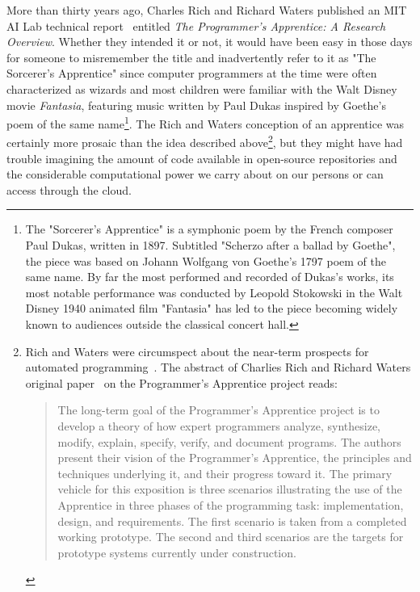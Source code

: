 More than thirty years ago, Charles Rich and Richard Waters published an MIT AI Lab technical report~\cite{RichandWatersAIM-87} entitled {\it{The Programmer's Apprentice: A Research Overview}}. Whether they intended it or not, it would have been easy in those days for someone to misremember the title and inadvertently refer to it as "The Sorcerer's Apprentice" since computer programmers at the time were often characterized as wizards and most children were familiar with the Walt Disney movie {\it{Fantasia}}, featuring music written by Paul Dukas inspired by Goethe's poem of the same name\footnote{%
%
  The "Sorcerer's Apprentice" is a symphonic poem by the French composer Paul Dukas, written in 1897. Subtitled "Scherzo after a ballad by Goethe", the piece was based on Johann Wolfgang von Goethe's 1797 poem of the same name. By far the most performed and recorded of Dukas's works, its most notable performance was conducted by Leopold Stokowski in the Walt Disney 1940 animated film "Fantasia" has led to the piece becoming widely known to audiences outside the classical concert hall. {}}.
%
The Rich and Waters conception of an apprentice was certainly more prosaic than the idea described above\footnote{%
%
  Rich and Waters were circumspect about the near-term prospects for automated programming~\cite{RichandWatersCOMPUTER-88}. The abstract of Charlies Rich and Richard Waters original paper~\cite{RichandWatersAIM-87} on the Programmer's Apprentice project reads:
%
  \begin{quotation}
%
    The long-term goal of the Programmer's Apprentice project is to develop a theory of how expert programmers analyze, synthesize, modify, explain, specify, verify, and document programs. The authors present their vision of the Programmer's Apprentice, the principles and techniques underlying it, and their progress toward it. The primary vehicle for this exposition is three scenarios illustrating the use of the Apprentice in three phases of the programming task: implementation, design, and requirements. The first scenario is taken from a completed working prototype. The second and third scenarios are the targets for prototype systems currently under construction.
%
  \end{quotation}}, but they might have had trouble imagining the amount of code available in open-source repositories and the considerable computational power we carry about on our persons or can access through the cloud.

